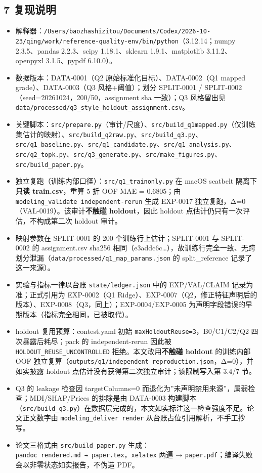 \documentclass[
  UTF8]{ctexart}
\providecommand{\tightlist}{%
  \setlength{\itemsep}{0pt}\setlength{\parskip}{0pt}}
\begin{document}
\subsection{7 复现说明}\label{ux590dux73b0ux8bf4ux660e}

\begin{itemize}
\tightlist
\item
  解释器：\texttt{/Users/baozhashizitou/Documents/Codex/2026-10-23/qing/work/reference-quality-env/bin/python}（3.12.14；numpy
  2.3.5、pandas 2.2.3、scipy 1.18.1、sklearn 1.9.1、matplotlib
  3.11.2、openpyxl 3.1.5、pypdf 6.10.0）。
\item
  数据版本：DATA-0001（Q2 原始标准化目标）、DATA-0002（Q1 mapped
  grade）、DATA-0003（Q3 风格+阈值）；划分 SPLIT-0001 /
  SPLIT-0002（seed=20261024，200/50，assignment sha 一致）；Q3
  风格留出见
  \texttt{data/processed/q3\_style\_holdout\_assignment.csv}。
\item
  关键脚本：\texttt{src/prepare.py}（审计/尺度）、\texttt{src/build\_q1mapped.py}（仅训练集估计的映射）、\texttt{src/build\_q2raw.py}、\texttt{src/build\_q3.py}、\texttt{src/q1\_baseline.py}、\texttt{src/q1\_candidate.py}、\texttt{src/q1\_analysis.py}、\texttt{src/q2\_topk.py}、\texttt{src/q3\_generate.py}、\texttt{src/make\_figures.py}、\texttt{src/build\_paper.py}。
\item
  独立复跑（训练内部口径）：\texttt{src/q1\_trainonly.py} 在 macOS
  seatbelt 隔离下\textbf{只读 train.csv}，重算 5 折 OOF MAE = 0.6805；由
  \texttt{modeling\_validate\ independent-rerun} 生成 EXP-0017
  独立复跑，Δ=0（VAL-0019）。该审计\textbf{不触碰 holdout}，因此 holdout
  点估计仍只有一次评估，不构成第二次 holdout 审计。
\item
  映射参数在 SPLIT-0001 的 200 个训练行上估计；SPLIT-0001 与 SPLIT-0002
  的 assignment.csv sha256
  相同（e3addc6c\ldots），故训练行完全一致、无跨划分泄漏（\texttt{data/processed/q1\_map\_params.json}
  的 split\_reference 记录了这一来源）。
\item
  实验与指标一律以台账 \texttt{state/ledger.json} 中的 EXP/VAL/CLAIM
  记录为准；正式引用为 EXP-0002（Q1
  Ridge）、EXP-0007（Q2，修正特征声明后的版本）、EXP-0008（Q3，同上）；EXP-0004/EXP-0005
  为声明字段错误的早期版本（指标完全相同，已被取代）。
\item
  holdout 复用预算：contest.yaml 初始
  \texttt{maxHoldoutReuse=3}，B0/C1/C2/Q2 四次暴露后耗尽；pack 的
  independent-rerun 因此被 \texttt{HOLDOUT\_REUSE\_UNCONTROLLED}
  拒绝。本文改用\textbf{不触碰 holdout} 的训练内部 OOF
  独立复算（\texttt{outputs/q1/independent\_reproduction.json}，Δ=0），并如实披露
  holdout 点估计没有获得第二次独立审计；该限制写入第 3.4/7 节。
\item
  Q3 的 leakage 检查因 targetColumns=0
  而退化为''未声明禁用来源''，属弱检查；MDI/SHAP/Prices 的排除是由
  DATA-0003
  构建脚本（\texttt{src/build\_q3.py}）在数据层完成的，本文如实标注这一检查强度不足。论文正文数字由
  \texttt{modeling\_deliver\ render} 从台账占位引用解析，不手工抄写。
\item
  论文三格式由 \texttt{src/build\_paper.py}
  生成：\texttt{pandoc\ rendered.md\ →\ paper.tex}，\texttt{xelatex}
  两遍 → \texttt{paper.pdf}；编译失败会以非零状态如实报告，不伪造 PDF。
\end{itemize}
\end{document}
